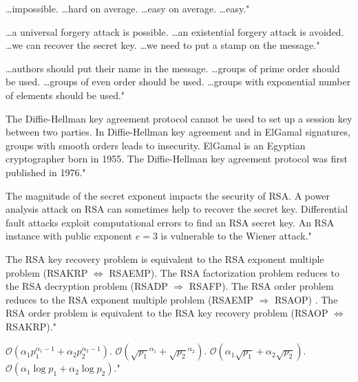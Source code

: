 {\ldots impossible.}
{\ldots hard on average.}
{\ldots easy on average.}
{\ldots easy."}

{\ldots a universal forgery attack is possible.}
{\ldots an existential forgery attack is avoided.}
{\ldots we can recover the secret key.}
{\ldots we need to put a stamp on the message."}

{\ldots authors should put their name in the message.}
{\ldots groups of prime order should be used.}
{\ldots groups of even order should be used.}
{\ldots groups with exponential number of elements should be used."}

{The Diffie-Hellman key agreement protocol cannot be used to set up a session key between two parties.}
{In Diffie-Hellman key agreement and in ElGamal signatures, groups with smooth orders leads to insecurity.}
{ElGamal is an Egyptian cryptographer born in 1955.}
{The Diffie-Hellman key agreement protocol was first published in 1976."}

{The magnitude of the secret exponent impacts the security of RSA.}
{A power analysis attack on RSA can sometimes help to recover the secret key.}
{Differential fault attacks exploit computational errors to find an RSA secret key.}
{An RSA instance with public exponent $e = 3$ is vulnerable to the Wiener attack."}

{The RSA key recovery problem is equivalent to the RSA exponent multiple problem (RSAKRP $\Leftrightarrow$ RSAEMP).}
{The RSA factorization problem reduces to the RSA decryption problem (RSADP $\Rightarrow$ RSAFP).}
{The RSA order problem reduces to the RSA exponent multiple problem (RSAEMP $\Rightarrow$ RSAOP) .}
{The RSA order problem is equivalent to the RSA key recovery problem (RSAOP $\Leftrightarrow$ RSAKRP)."}

{$\mathcal{O}(\alpha_1 p_1^{\alpha_1 -1} + \alpha_2 p_2^{\alpha_2 -1})$.}
{$\mathcal{O}(\sqrt{p_1}^{\alpha_1} + \sqrt{p_2}^{\alpha_2})$.}
{$\mathcal{O}( \alpha_1 \sqrt{p_1} + \alpha_2 \sqrt{p_2})$.}
{$\mathcal{O}( \alpha_1 \log{p_1} + \alpha_2 \log{p_2})$."}

